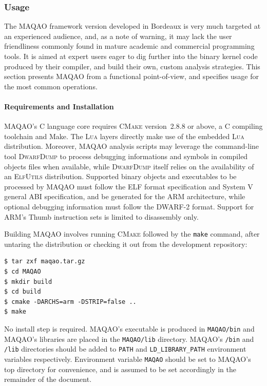 \documentclass[11pt, a4paper, twoside]{montblanc2}
\def\cmake{\textsc{CMake}\xspace}
\def\lua{\textsc{Lua}\xspace}
\def\dd{\textsc{DwarfDump}\xspace}
\def\elfutils{\textsc{ElfUtils}\xspace}
\begin{document}
\subsubsection{Usage}

The MAQAO framework version developed in Bordeaux is very much targeted at an experienced audience, 
and, as a note of warning, it may lack the user friendliness commonly found in mature academic and 
commercial programming tools. It is aimed at expert users eager to dig further into the binary 
kernel code produced by their compiler, and build their own, custom analysis strategies.
This section presents MAQAO from a functional point-of-view, and specifies usage for the most common
operations.

\paragraph{Requirements and Installation}

MAQAO's C language core requires \cmake version~2.8.8 or above, a C compiling toolchain 
and Make. The \lua layers directly make use of the embedded \lua distribution. Moreover, MAQAO 
analysis scripts may leverage the command-line tool \dd to process debugging informations and 
symbols in compiled objects files when available, while \dd itself relies on the availability of an 
\elfutils distribution. Supported binary objects and executables to be processed by MAQAO must 
follow the ELF format specification and System V general ABI specification, and be generated for the 
ARM architecture, while optional debugging information must follow the DWARF-2 format. Support for 
ARM's Thumb instruction sets is limited to disassembly only.

Building MAQAO involves running \cmake followed by the \verb|make| command, after untaring the 
distribution or checking it out from the development repository:

\begin{verbatim}
$ tar zxf maqao.tar.gz
$ cd MAQAO
$ mkdir build
$ cd build
$ cmake -DARCHS=arm -DSTRIP=false ..
$ make
\end{verbatim}

No install step is required. MAQAO's executable is produced in \verb|MAQAO/bin| and MAQAO's 
libraries are placed in the \verb|MAQAO/lib| directory. MAQAO's \verb|/bin| and \verb|/lib|
directories should be added to \verb|PATH| and \verb|LD_LIBRARY_PATH| environment variables 
respectively. Environment variable \verb|MAQAO| should be set to MAQAO's top directory for 
convenience, and is assumed to be set accordingly in the remainder of the document.
\end{document}
